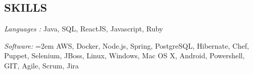 \documentclass[12pt, line, margin]{res}
\begin{document}

\address{
}

\begin{resume}


\section{SKILLS} {\sl Languages :} Java, SQL, ReactJS, Javascript, Ruby

               {\sl Software:}  
			\hangindent=2em
			AWS, Docker, Node.js, Spring, PostgreSQL, Hibernate, \newline 
			Chef, Puppet, Selenium, JBoss, Linux, Windows, Mac OS X, \newline 
                                Android, Powershell, GIT, Agile, Scrum, Jira
			

\end{resume}
\end{document}
